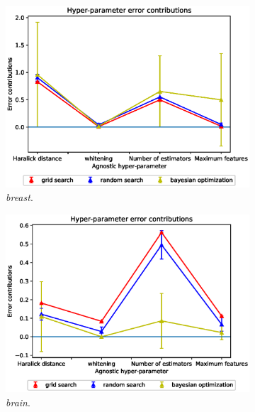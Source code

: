 \begin{figure}[ht!]
\centering
\begin{subfigure}{.5\textwidth}
  \centering
  \includegraphics[scale=0.37]{img/EP/agnostic_error_hyper_breast.eps}
  \caption{\textit{breast}.}
  \label{fig:eq_hyper_breast}
\end{subfigure}%
\begin{subfigure}{.5\textwidth}
  \centering
  \includegraphics[scale=0.37]{img/EP/agnostic_error_hyper_brain.eps}
  \caption{\textit{brain}.}
  \label{fig:eq_hyper_brain}
\end{subfigure}
\begin{subfigure}{.5\textwidth}
  \centering

\end{subfigure}
\end{figure}
